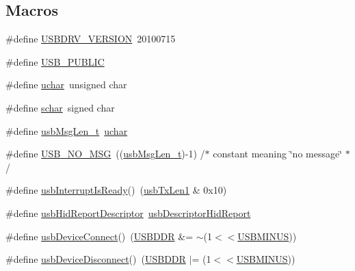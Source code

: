 \subsection*{Macros}
\begin{DoxyCompactItemize}
\item 
\#define \hyperlink{mhvlib-_vusb-_keyboard_2vusb_2usbdrv_8h_a938381382a94d1c945b7233fcfa78e0e}{U\-S\-B\-D\-R\-V\-\_\-\-V\-E\-R\-S\-I\-O\-N}~20100715
\item 
\#define \hyperlink{mhvlib-_vusb-_keyboard_2vusb_2usbdrv_8h_a5f6aa87267678dc37dd5d97a7b3df7c3}{U\-S\-B\-\_\-\-P\-U\-B\-L\-I\-C}
\item 
\#define \hyperlink{mhvlib-_vusb-_keyboard_2vusb_2usbdrv_8h_aa8ddf20cdd716b652e76e23e5e700893}{uchar}~unsigned char
\item 
\#define \hyperlink{mhvlib-_vusb-_keyboard_2vusb_2usbdrv_8h_af2cbb84f982ea77dfbb738af3a027591}{schar}~signed char
\item 
\#define \hyperlink{mhvlib-_vusb-_keyboard_2vusb_2usbdrv_8h_a57df3bf9fc8ec8cd9b29ba8dfc361059}{usb\-Msg\-Len\-\_\-t}~\hyperlink{mhvlib-_vusb-_console_2vusb_2usbdrv_8h_aa8ddf20cdd716b652e76e23e5e700893}{uchar}
\item 
\#define \hyperlink{mhvlib-_vusb-_keyboard_2vusb_2usbdrv_8h_a0bf378ff9540265128eef4f085176dcc}{U\-S\-B\-\_\-\-N\-O\-\_\-\-M\-S\-G}~((\hyperlink{mhvlib-_vusb-_console_2vusb_2usbdrv_8h_a57df3bf9fc8ec8cd9b29ba8dfc361059}{usb\-Msg\-Len\-\_\-t})-\/1)   /$\ast$ constant meaning \char`\"{}no message\char`\"{} $\ast$/
\item 
\#define \hyperlink{mhvlib-_vusb-_keyboard_2vusb_2usbdrv_8h_a1f6b221fb650a7575d4937e37956181d}{usb\-Interrupt\-Is\-Ready}()~(\hyperlink{mhvlib-_vusb-_console_2vusb_2usbdrv_8h_aac21ed24e5889d02bdecaefb2881dca9}{usb\-Tx\-Len1} \& 0x10)
\item 
\#define \hyperlink{mhvlib-_vusb-_keyboard_2vusb_2usbdrv_8h_a37718d9af25fd62f30b25e057468e39b}{usb\-Hid\-Report\-Descriptor}~\hyperlink{mhvlib-_vusb-_console_2vusb_2usbdrv_8h_a66e1ec15fd4a4458927902d3764179af}{usb\-Descriptor\-Hid\-Report}
\item 
\#define \hyperlink{mhvlib-_vusb-_keyboard_2vusb_2usbdrv_8h_a475d8622b0e0b64b65312970940c600e}{usb\-Device\-Connect}()~(\hyperlink{mhvlib-_vusb-_console_2vusb_2usbdrv_8h_a3ffc8a49ee40206cfce717574a1ccfea}{U\-S\-B\-D\-D\-R} \&= $\sim$(1$<$$<$\hyperlink{mhvlib-_vusb-_console_2vusb_2usbdrv_8h_ad84a1c137f273772bcba266e0a671d33}{U\-S\-B\-M\-I\-N\-U\-S}))
\item 
\#define \hyperlink{mhvlib-_vusb-_keyboard_2vusb_2usbdrv_8h_a82287e0a9f6403a674aae635f4c9ce37}{usb\-Device\-Disconnect}()~(\hyperlink{mhvlib-_vusb-_console_2vusb_2usbdrv_8h_a3ffc8a49ee40206cfce717574a1ccfea}{U\-S\-B\-D\-D\-R} $|$= (1$<$$<$\hyperlink{mhvlib-_vusb-_console_2vusb_2usbdrv_8h_ad84a1c137f273772bcba266e0a671d33}{U\-S\-B\-M\-I\-N\-U\-S}))

\end{DoxyCompactItemize}
